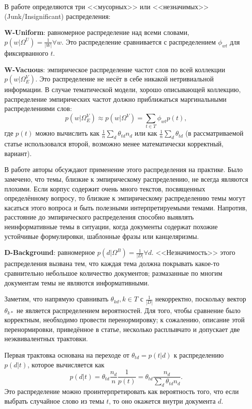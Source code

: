В работе \cite{alsumait2009topic} определяются три <<мусорных>> или <<незначимых>> (Junk/Insignificant) распределения:

\textbf{W-Uniform}: равномерное распределение над всеми словами, $p(w|\Omega^U) = \frac{1}{|W|} \forall w$. Это распределение сравнивается с распределением $\phi_{wt}$ для фиксирванного $t$.

\textbf{W-Vacuous}: эмпирическое распределение частот слов по всей коллекции $p(w|\Omega^V_E)$. Это распределение не несёт в себе никакой нетривиальной информации. В случае тематической модели, хорошо описывающей коллекцию, распределение эмпирических частот должно приближаться маргинальными распределениями слов: 
$$
    p(w|\Omega^V_E) \approx p(w|\Omega^V) = \sum_{t \in T} \phi_{wt}p(t), 
$$
где $p(t)$ можно вычислить как $\frac{1}{n}\sum_d \theta_{td} n_d$ или как $\frac{1}{n}\sum_d \theta_{td}$ (в рассматриваемой статье использовался второй, возможно менее математически корректный, вариант).

В работе \cite{boydcare} авторы обсуждают применение этого распределения на практике. Было замечено, что темы, близкие к эмпирическому распределению, не всегда являются плохими. Если корпус содержит очень много текстов, посвященных определённому вопросу, то близкие к эмпирическому распределению темы могут касаться этого вопроса и быть полезными интерпретируемыми темами. Напротив, расстояние до эмпирического распределения способно выявлять неинформативные темы в ситуации, когда документы содержат похожие устойчивые формулировки, шаблонные фразы или канцеляризмы.

\textbf{D-Background}: равномерное $p(d|\Omega^B) = \frac{1}{|D|} \forall d$. <<Незначимость>> этого распределения вызвана тем, что каждая тема должна покрывать какое-то сравнительно небольшое количество документов; размазанные по многим документам темы не являются информативными. 

Заметим, что напрямую сравнивать $\theta_{k d}, k \in T$ с $\frac{1}{|D|}$ некорректно, поскольку вектор $\theta_{k \ast}$ не является распределением вероятностей. Для того, чтобы сравнение было корректным, необходимо провести перенормировку; к сожалению, описание этой перенормировки, приведённое в статье, несколько расплывчато и допускает две неэквивалентных трактовки.

Первая трактовка основана на переходе от $\theta_{td} = p(t|d)$ к распределению $p(d|t)$, которое вычисляется как 
$$
    p(d|t) = \theta_{td} \frac{n_d}{n} \frac{1}{p(t)} = \theta_{td} \frac{n_d}{\sum_d \theta_{td} n_d}.
$$
Это распределение можно проинтерпретировать как вероятность того, что если выбрать случайное слово из темы $t$, то оно окажется внутри документа $d$.

